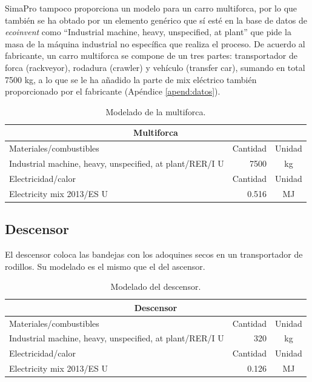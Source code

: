 SimaPro tampoco proporciona un modelo para un carro multiforca, por lo que también se ha obtado por un elemento genérico que sí esté en la base de datos de \textit{ecoinvent} como ``Industrial machine, heavy, unspecified, at plant'' que pide la masa de la máquina industrial no específica que realiza el proceso. De acuerdo al fabricante, un carro multiforca se compone de un tres partes: transportador de forca (rackveyor), rodadura (crawler) y vehículo (transfer car), sumando en total 7500 \si{kg}, a lo que se le ha añadido la parte de mix eléctrico también proporcionado por el fabricante (Apéndice \ref{apend:datos}).

\begin{table}[!htb]
\centering
\begin{tabular}{p{8cm}rc}
\toprule
\multicolumn{3}{c}{Multiforca}\\
\midrule
Materiales/combustibles & Cantidad & Unidad\\
\midrule
Industrial machine, heavy, unspecified, at plant/RER/I U & 7500 & \si{kg}\\
\midrule
Electricidad/calor & Cantidad & Unidad\\
\midrule
Electricity mix 2013/ES U & 0.516 & \si{MJ}\\
\bottomrule
\end{tabular}
\caption{Modelado de la multiforca.}
\label{modeladomultiforca}
\end{table}

\subsection{Descensor}
El descensor coloca las bandejas con los adoquines secos en un transportador de rodillos. Su modelado es el mismo que el del ascensor.

\begin{table}[!htb]
\centering
\begin{tabular}{p{8cm}rc}
\toprule
\multicolumn{3}{c}{Descensor}\\
\midrule
Materiales/combustibles & Cantidad & Unidad\\
\midrule
Industrial machine, heavy, unspecified, at plant/RER/I U & 320 & \si{kg}\\
\midrule
Electricidad/calor & Cantidad & Unidad\\
\midrule
Electricity mix 2013/ES U & 0.126 & \si{MJ}\\
\bottomrule
\end{tabular}
\caption{Modelado del descensor.}
\label{modeladodeldescensor}
\end{table}

